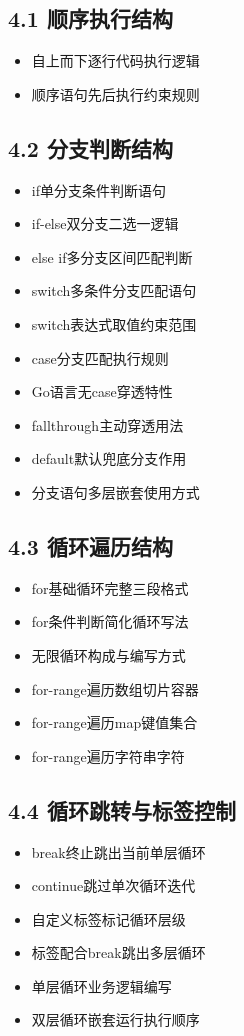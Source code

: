 \subsection{4.1 顺序执行结构}
\begin{itemize}
\item 自上而下逐行代码执行逻辑
\item 顺序语句先后执行约束规则
\end{itemize}

\subsection{4.2 分支判断结构}
\begin{itemize}
\item if单分支条件判断语句
\item if-else双分支二选一逻辑
\item else if多分支区间匹配判断
\item switch多条件分支匹配语句
\item switch表达式取值约束范围
\item case分支匹配执行规则
\item Go语言无case穿透特性
\item fallthrough主动穿透用法
\item default默认兜底分支作用
\item 分支语句多层嵌套使用方式
\end{itemize}

\subsection{4.3 循环遍历结构}
\begin{itemize}
\item for基础循环完整三段格式
\item for条件判断简化循环写法
\item 无限循环构成与编写方式
\item for-range遍历数组切片容器
\item for-range遍历map键值集合
\item for-range遍历字符串字符
\end{itemize}

\subsection{4.4 循环跳转与标签控制}
\begin{itemize}
\item break终止跳出当前单层循环
\item continue跳过单次循环迭代
\item 自定义标签标记循环层级
\item 标签配合break跳出多层循环
\item 单层循环业务逻辑编写
\item 双层循环嵌套运行执行顺序
\end{itemize}

